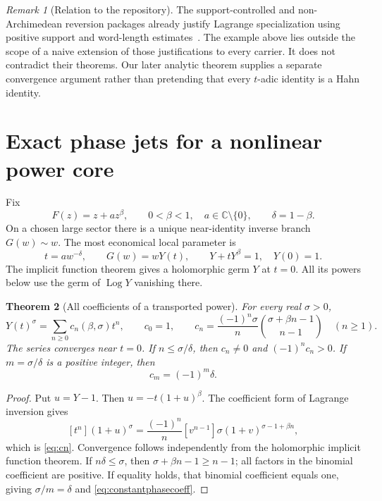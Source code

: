 \documentclass[11pt,a4paper]{article}
\newtheorem{theorem}{Theorem}[section]
\theoremstyle{definition}
\theoremstyle{remark}
\newtheorem{remark}[theorem]{Remark}
\newcommand{\C}{\mathbb C}
\newcommand{\Log}{\operatorname{Log}}
\numberwithin{equation}{section}
\begin{document}
\begin{remark}[Relation to the repository]
The support-controlled and non-Archimedean reversion packages already justify Lagrange specialization using positive support and word-length estimates~\cite{RepoSupport,RepoNonArch}. The example above lies outside the scope of a naive extension of those justifications to every carrier. It does not contradict their theorems. Our later analytic theorem supplies a separate convergence argument rather than pretending that every $t$-adic identity is a Hahn identity.
\end{remark}

\section{Exact phase jets for a nonlinear power core}\label{sec:phasejets}

Fix
\begin{equation}\label{eq:powercore}
 F(z)=z+az^\beta,\qquad 0<\beta<1,\quad a\in\C\setminus\{0\},
 \qquad \delta=1-\beta.
\end{equation}
On a chosen large sector there is a unique near-identity inverse branch $G(w)\sim w$. The most economical local parameter is
\begin{equation}\label{eq:Ydef}
 t=aw^{-\delta},\qquad G(w)=wY(t),\qquad Y+tY^\beta=1,\quad Y(0)=1.
\end{equation}
The implicit function theorem gives a holomorphic germ $Y$ at $t=0$. All its powers below use the germ of $\Log Y$ vanishing there.

\begin{theorem}[All coefficients of a transported power]\label{thm:powercoeff}
For every real $\sigma>0$,
\begin{equation}\label{eq:cn}
 Y(t)^\sigma=\sum_{n\ge0}c_n(\beta,\sigma)t^n,
 \qquad c_0=1,\qquad
 c_n=\frac{(-1)^n\sigma}{n}
 \binom{\sigma+\beta n-1}{n-1}\quad(n\ge1).
\end{equation}
The series converges near $t=0$. If $n\le\sigma/\delta$, then $c_n\ne0$ and $(-1)^nc_n>0$. If $m=\sigma/\delta$ is a positive integer, then
\begin{equation}\label{eq:constantphasecoeff}
 c_m=(-1)^m\delta.
\end{equation}
\end{theorem}
\begin{proof}
Put $u=Y-1$. Then $u=-t(1+u)^\beta$. The coefficient form of Lagrange inversion gives
\[
 [t^n](1+u)^\sigma
 =\frac{(-1)^n}{n}[v^{n-1}]\sigma(1+v)^{\sigma-1+\beta n},
\]
which is \eqref{eq:cn}. Convergence follows independently from the holomorphic implicit function theorem. If $n\delta\le\sigma$, then
$\sigma+\beta n-1\ge n-1$; all factors in the binomial coefficient are positive. If equality holds, that binomial coefficient equals one, giving $\sigma/m=\delta$ and \eqref{eq:constantphasecoeff}.
\end{proof}
\end{document}
